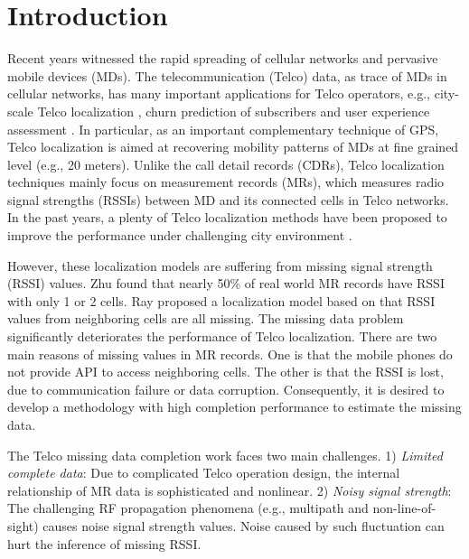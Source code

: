 \section{Introduction}
Recent years witnessed the rapid spreading of cellular networks and pervasive mobile devices (MDs). The telecommunication (Telco) data, as trace of MDs in cellular networks, has many important applications for Telco operators, e.g., city-scale Telco localization \cite{DBLP:conf/cikm/ZhuLYZZGDRZ16}, churn prediction of subscribers \cite{DBLP:conf/sigmod/HuangZYDLND0Z15} and user experience assessment \cite{DBLP:journals/tist/LuoZYDY16}. In particular, as an important complementary technique of GPS, Telco localization is aimed at recovering mobility patterns of MDs at fine grained level (e.g., 20 meters). Unlike the call detail records (CDRs), Telco localization techniques mainly focus on measurement records (MRs), which measures radio signal strengths (RSSIs) between MD and its connected cells in Telco networks. In the past years, a plenty of Telco localization methods have been proposed to improve the performance under challenging city environment \cite{DBLP:conf/icc/IbrahimY11, DBLP:conf/icc/HaraAYDZ11,DBLP:journals/tvt/IbrahimY12,DBLP:conf/infocom/RayDM16,DBLP:conf/infocom/MargoliesBBDJUV17}.

However, these localization models are suffering from missing signal strength (RSSI) values. Zhu \cite{DBLP:conf/cikm/ZhuLYZZGDRZ16} found that nearly 50\% of real world MR records have RSSI with only 1 or 2 cells. Ray \cite{DBLP:conf/infocom/RayDM16} proposed a localization model based on that RSSI values from neighboring cells are all missing. The missing data problem significantly deteriorates the performance of Telco localization. There are two main reasons of missing values in MR records. One is that the mobile phones do not provide API to access neighboring cells. The other is that the RSSI is lost, due to communication failure or data corruption. Consequently, it is desired to develop a methodology with high completion performance to estimate the missing data.

The Telco missing data completion work faces two main challenges. 1) \emph{Limited complete data}: Due to complicated Telco operation design, the internal relationship of MR data is sophisticated and nonlinear. 2) \emph{Noisy signal strength}: The challenging RF propagation phenomena (e.g., multipath and non-line-of-sight) causes noise signal strength values. Noise caused by such fluctuation can hurt the inference of missing RSSI.

